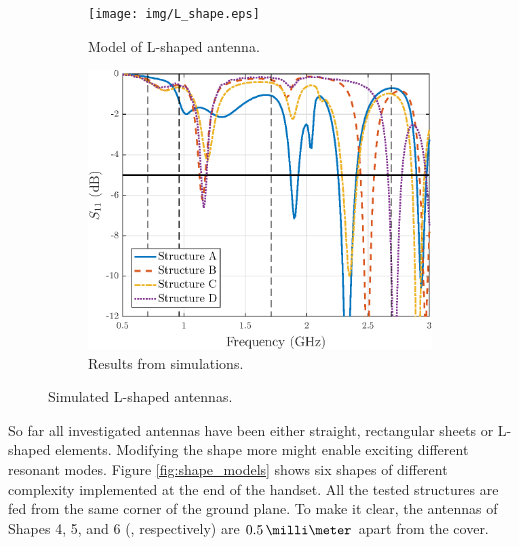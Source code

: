 \begin{figure}[H]
    \centering
    \begin{subfigure}[b]{0.49\textwidth}
        \texttt{[image: img/L\_shape.eps]}
        \caption{Model of L-shaped antenna.}
        \label{fig:l_shape_model}
    \end{subfigure}
    \begin{subfigure}[b]{0.49\textwidth}
        \includegraphics[width=\textwidth]{img/L_shape_res.eps}
        \caption{Results from simulations.}
        \label{fig:l_shape_res}
    \end{subfigure}
    \caption{Simulated L-shaped antennas.}
    \label{fig:l_shape}
\end{figure}

So far all investigated antennas have been either straight, rectangular sheets or L-shaped elements. Modifying the shape more might enable exciting different resonant modes. Figure \ref{fig:shape_models} shows six shapes of different complexity implemented at the end of the handset. All the tested structures are fed from the same corner of the ground plane. To make it clear, the antennas of Shapes 4, 5, and 6 (, respectively) are $0.5\,\milli\meter$ apart from the cover.

